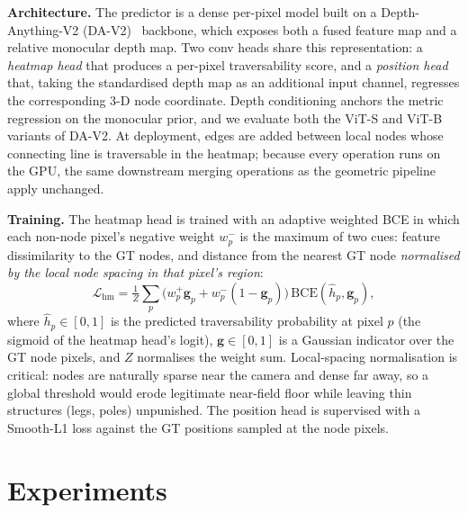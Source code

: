 \documentclass{article}
\begin{document}
\textbf{Architecture.}
The predictor is a dense per-pixel model built on a Depth-Anything-V2
(DA-V2)~\cite{yang2024depthv2} backbone, which exposes both a fused
feature map and a relative monocular depth map. Two conv heads share
this representation: a \emph{heatmap head} that produces a per-pixel
traversability score, and a \emph{position head} that, taking the
standardised depth map as an additional input channel, regresses the
corresponding 3-D node coordinate. Depth conditioning anchors the
metric regression on the monocular prior, and we evaluate both the
ViT-S and ViT-B variants of DA-V2. At deployment, edges are added
between local nodes whose connecting line is traversable in the
heatmap; because every operation runs on the GPU, the same downstream
merging operations as the geometric pipeline apply unchanged.


\textbf{Training.}
The heatmap head is trained with an adaptive weighted BCE in which
each non-node pixel's negative weight $w_p^{-}$ is the maximum of two
cues: feature dissimilarity to the GT nodes, and distance from the
nearest GT node \emph{normalised by the local node spacing in that
pixel's region}:
\begin{equation}
\mathcal{L}_{\text{hm}} =
\tfrac{1}{Z}\sum_{p}\bigl(w^{+}_{p}\mathbf{g}_p + w^{-}_{p}(1-\mathbf{g}_p)\bigr)\,
\mathrm{BCE}(\hat{h}_p,\mathbf{g}_p),
\end{equation}
where $\hat{h}_p \in [0,1]$ is the predicted traversability probability
at pixel $p$ (the sigmoid of the heatmap head's logit),
$\mathbf{g}\in[0,1]$ is a Gaussian indicator over the GT node pixels,
and $Z$ normalises the weight sum. Local-spacing normalisation
is critical: nodes are naturally sparse near the camera and dense far
away, so a global threshold would erode legitimate near-field floor
while leaving thin structures (legs, poles) unpunished. The position
head is supervised with a Smooth-L1 loss against the GT positions
sampled at the node pixels.




\section{Experiments}


\end{document}
